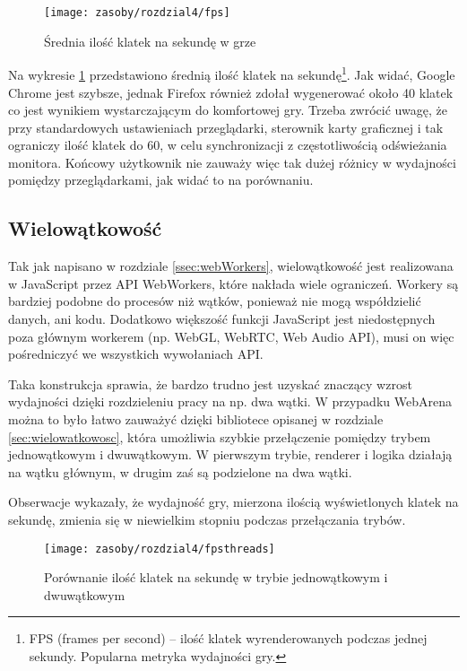 \begin{figure}[h]
  \centering
  \texttt{[image: zasoby/rozdzial4/fps]}
  \caption {Średnia ilość klatek na sekundę w grze}
  \label{fig:fps}
\end{figure}

Na wykresie \ref{fig:fps} przedstawiono średnią ilość klatek na sekundę\footnote{FPS (frames per second)
  -- ilość klatek wyrenderowanych podczas jednej sekundy. Popularna metryka wydajności gry.}. Jak
widać, Google Chrome jest szybsze, jednak Firefox również zdołał wygenerować około 40 klatek co jest
wynikiem wystarczającym do komfortowej gry. Trzeba zwrócić uwagę, że przy standardowych
ustawieniach przeglądarki, sterownik karty graficznej i tak ograniczy ilość klatek do 60, w celu
synchronizacji z częstotliwością odświeżania monitora. Końcowy użytkownik nie zauważy więc tak dużej różnicy
w wydajności pomiędzy przeglądarkami, jak widać to na porównaniu.

\subsection{Wielowątkowość}

Tak jak napisano w rozdziale \ref{ssec:webWorkers}, wielowątkowość jest realizowana w JavaScript przez API
WebWorkers, które nakłada wiele ograniczeń. Workery są bardziej podobne do procesów niż wątków, ponieważ
nie mogą współdzielić danych, ani kodu. Dodatkowo większość funkcji JavaScript jest niedostępnych
poza głównym workerem (np. WebGL, WebRTC, Web Audio API), musi on więc pośredniczyć we wszystkich
wywołaniach API.

Taka konstrukcja sprawia, że bardzo trudno jest uzyskać znaczący wzrost wydajności dzięki rozdzieleniu
pracy na np. dwa wątki. W przypadku WebArena można to było łatwo zauważyć dzięki bibliotece opisanej
w rozdziale \ref{sec:wielowatkowosc}, która umożliwia szybkie przełączenie pomiędzy trybem jednowątkowym
i dwuwątkowym. W pierwszym trybie, renderer i logika działają na wątku głównym, w drugim zaś są podzielone
na dwa wątki.

Obserwacje wykazały, że wydajność gry, mierzona ilością wyświetlonych klatek na sekundę, zmienia
się w niewielkim stopniu podczas przełączania trybów.

\begin{figure}[h]
  \centering
  \texttt{[image: zasoby/rozdzial4/fpsthreads]}
  \caption {Porównanie ilość klatek na sekundę w trybie jednowątkowym i dwuwątkowym}
  \label{fig:fpsThreads}
\end{figure}


